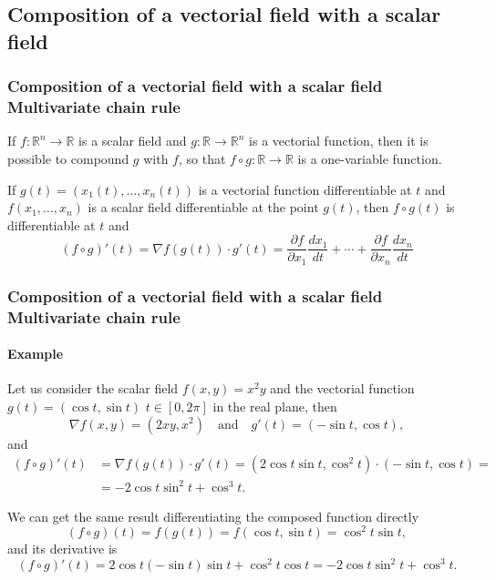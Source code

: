 \subsection{Composition of a vectorial field with a scalar field}
\begin{frame}
\frametitle{Composition of a vectorial field with a scalar field\\ Multivariate chain rule}
If $f:\mathbb{R}^n\rightarrow \mathbb{R}$ is a scalar field and $g:\mathbb{R}\rightarrow \mathbb{R}^n$ is a vectorial function, then it is possible to compound $g$ with $f$, so that $f\circ g:\mathbb{R}\rightarrow \mathbb{R}$ is a one-variable function.

\begin{theorem}
If $g(t)=(x_1(t),\ldots,x_n(t))$ is a vectorial function differentiable at $t$ and $f(x_1,\ldots,x_n)$ is a scalar field differentiable at the point $g(t)$, then $f\circ g(t)$ is differentiable at $t$ and 
\[
(f\circ g)'(t) = \nabla f(g(t))\cdot g'(t)=\frac{\partial f}{\partial x_1}\frac{dx_1}{dt}+ \cdots + \frac{\partial f}{\partial x_n}\frac{dx_n}{dt}
\]
\end{theorem}
\end{frame}


\begin{frame}
\frametitle{Composition of a vectorial field with a scalar field\\ Multivariate chain rule}
\framesubtitle{Example}
Let us consider the scalar field $f(x,y)=x^2y$ and the vectorial function $g(t)=(\cos t,\sin t)$ $t\in [0,2\pi]$ in the real plane, then
\[
\nabla f(x,y) = (2xy, x^2) \quad  \mbox{and} \quad g'(t) = (-\sin t, \cos t),
\]
and
\begin{align*}
(f\circ g)'(t) &= \nabla f(g(t))\cdot g'(t) = (2\cos t\sin t,\cos^2 t)\cdot (-\sin t,\cos t) =\\
&= -2\cos t\sin^2 t+\cos^3 t.
\end{align*}

We can get the same result differentiating the composed function directly
\[
(f\circ g)(t) = f(g(t)) = f(\cos t, \sin t) = \cos^2 t\sin t,
\]
and its derivative is 
\[
(f\circ g)'(t) = 2\cos t(-\sin t)\sin t+\cos^2 t \cos t = -2\cos t\sin^2 t+\cos^3 t.
\]
\end{frame}


